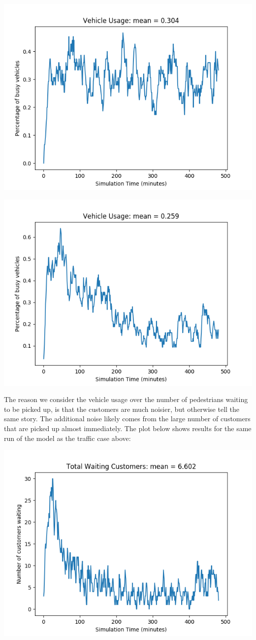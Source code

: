 \documentclass[Proceedings]{ascelike}
\begin{document}
\includegraphics[width=0.75 \textwidth]{no_traffic_vehicles}

\includegraphics[width=0.75 \textwidth]{traffic_vehicles}

The reason we consider the vehicle usage over the number of pedestrians waiting to be picked up, is that the
customers are much noisier, but otherwise tell the same story. The additional noise likely comes from the
large number of customers that are picked up almost immediately. The plot below shows results for the same run
of the model as the traffic case above:

\includegraphics[width=0.75 \textwidth]{total_customers}
\end{document}
